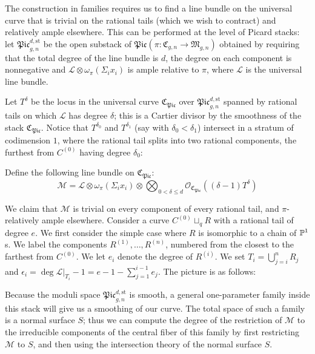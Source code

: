 The construction in families requires us to find a line bundle on the universal curve that is trivial on the rational tails (which we wish to contract) and relatively ample elsewhere. This can be performed at the level of Picard stacks: let $\mathfrak{Pic}_{g,n}^{d,\text{st}}$ be the open substack of $\mathfrak{Pic}(\pi\colon\mathfrak{C}_{g,n}\to\mathfrak{M}_{g,n})$ obtained by requiring that the total degree of the line bundle is $d$, the degree on each component is nonnegative and $\mathcal L\otimes\omega_{\pi}(\Sigma_i x_i)$ is ample relative to $\pi$, where $\mathcal L$ is the universal line bundle.

Let $T^{\delta}$ be the locus in the universal curve $\mathfrak{C}_{\mathfrak{Pic}}$ over $\mathfrak{Pic}_{g,n}^{d,\text{st}}$ spanned by rational tails on which $\mathcal L$ has degree $\delta$; this is a Cartier divisor by the smoothness of the stack $\mathfrak{C}_{\mathfrak{Pic}}$. Notice that $T^{\delta_0}$ and $T^{\delta_1}$ (say with $\delta_0<\delta_1$) intersect in a stratum of codimension $1$, where the rational tail splits into two rational components, the furthest from $C^{(0)}$ having degree $\delta_0$:

\begin{center}

\end{center}
\medskip

Define the following line bundle on $\mathfrak{C}_{\mathfrak{Pic}}$:
\begin{equation*} \mathcal M=\mathcal L\otimes\omega_{\pi}(\Sigma_i x_i)\otimes\bigotimes_{0<\delta\leq d}\mathcal O_{\mathfrak{C}_{\mathfrak{Pic}}}((\delta-1) T^\delta) \end{equation*}

We claim that $\mathcal{M}$ is trivial on every component of every rational tail, and $\pi$-relatively ample elsewhere. Consider a curve $C^{(0)}\sqcup_q R$ with a rational tail of degree $e$. We first consider the simple case where $R$ is isomorphic to a chain of $\mathbb P^1$s. We label the components $R^{(1)},\ldots,R^{(n)}$, numbered from the closest to the farthest from $C^{(0)}$. We let $e_i$ denote the degree of $R^{(i)}$. We set $T_i=\bigcup_{j=i}^n R_j$ and $\epsilon_i=\deg \mathcal{L}|_{T_i} - 1 = e-1-\sum_{j=1}^{i-1} e_j$. The picture is as follows:

\begin{center}

\end{center}

Because the moduli space $\mathfrak{Pic}_{g,n}^{d,\text{st}}$ is smooth, a general one-parameter family inside this stack will give us a smoothing of our curve. The total space of such a family is a normal surface $S$; thus we can compute the degree of the restriction of $\mathcal M$ to the irreducible components of the central fiber of this family by first restricting $\mathcal M$ to $S$, and then using the intersection theory of the normal surface $S$.

